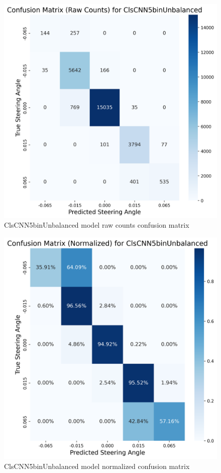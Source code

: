 \begin{figure}[H]
\centering
\includegraphics[width=0.65\linewidth]{Figures/Results/cm_raw_ClsCNN5binUnbalanced.png}
\caption{ClsCNN5binUnbalanced model raw counts confusion matrix}
\label{fig:cm_raw_ClsCNN5binUnbalanced}
\end{figure}


\begin{figure}[H]
\centering
\includegraphics[width=0.65\linewidth]{Figures/Results/cm_norm_ClsCNN5binUnbalanced.png}
\caption{ClsCNN5binUnbalanced model normalized confusion matrix}
\label{fig:cm_norm_ClsCNN5binUnbalanced}
\end{figure}


